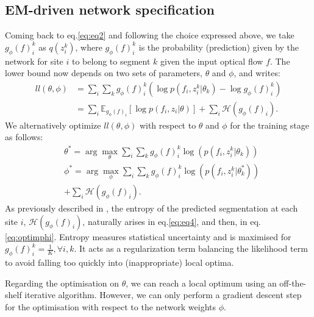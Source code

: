 \documentclass[10pt,twocolumn,letterpaper]{article}
\begin{document}
\subsection{EM-driven network specification}
\label{sec:EMNet}

Coming back to eq.\eqref{eq:eq2} and following the choice expressed above, we take $g_\phi(f)_i^k$ as $q(z_i^k)$, where $g_\phi(f)_i^k$ is the probability (prediction) given by the network for site $i$ to belong to segment $k$ given the input optical flow $f$.
The lower bound now depends on two sets of parameters, $\theta$ and $\phi$, and writes:
\begin{align}
\label{eq:eq4}
ll(\theta, \phi)
&= \sum_i \sum_k  g_\phi(f)_i^k  (\log p(f_i, z_i^k | \theta_k) - \log g_\phi(f)_i^k)  \nonumber\\
&= \sum_i \mathbb E_{g_\phi(f)_i}[\log p(f_i , z_i | \theta) ] + \sum_i \mathcal H(g_\phi(f)_i).
\end{align}
We alternatively optimize $ll(\theta, \phi)$ with respect to $\theta$ and $\phi$ for the training stage as follows:
\begin{align}
\label{eq:optimtheta}
&\theta^* = \arg \max_{\theta} \sum_i \sum_k g_\phi(f)^k_i \log(p(f_i , z_i^k | \theta_k)) \\
\label{eq:optimphi}
&\phi^* = \arg \max_{\phi}\sum_i \sum_k g_{\phi}(f)_i^k \log(p(f_i , z^k_i | \theta_k^*)) \nonumber\\
&+ \sum_i \mathcal H(g_{\phi}(f)_i).
\end{align}
As previously described in \cite{hathaway1986}, the entropy of the predicted segmentation at each site $i$, $\mathcal{H}(g_{\phi}(f)_i)$, naturally arises in eq.\eqref{eq:eq4}, and then, in eq.\eqref{eq:optimphi}. Entropy measures statistical uncertainty and is maximised for $g_\phi(f)_i^k = \frac 1K, \forall i,k$. It acts as a regularization term balancing the likelihood term to avoid falling too quickly into (inappropriate) local optima. 

Regarding the optimisation on $\theta$, we can reach a local optimum using an off-the-shelf iterative algorithm. However, we can only perform a gradient descent step for the optimisation with respect to the network weights $\phi$.
\end{document}
